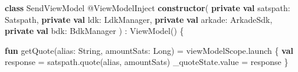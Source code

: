 \documentclass[
]{article}
\newenvironment{Shaded}{}{}
\newcommand{\DataTypeTok}[1]{\textcolor[rgb]{0.56,0.13,0.00}{#1}}
\newcommand{\FunctionTok}[1]{\textcolor[rgb]{0.02,0.16,0.49}{#1}}
\newcommand{\KeywordTok}[1]{\textcolor[rgb]{0.00,0.44,0.13}{\textbf{#1}}}
\newcommand{\NormalTok}[1]{#1}
\newcommand{\OperatorTok}[1]{\textcolor[rgb]{0.40,0.40,0.40}{#1}}
\newcommand{\VariableTok}[1]{\textcolor[rgb]{0.10,0.09,0.49}{#1}}
\begin{document}
\begin{Shaded}
\begin{Highlighting}[]
\KeywordTok{class}\NormalTok{ SendViewModel @ViewModelInject }\KeywordTok{constructor}\OperatorTok{(}
    \KeywordTok{private} \KeywordTok{val} \VariableTok{satspath}\OperatorTok{:} \DataTypeTok{Satspath}\OperatorTok{,}
    \KeywordTok{private} \KeywordTok{val} \VariableTok{ldk}\OperatorTok{:} \DataTypeTok{LdkManager}\OperatorTok{,}
    \KeywordTok{private} \KeywordTok{val} \VariableTok{arkade}\OperatorTok{:} \DataTypeTok{ArkadeSdk}\OperatorTok{,}
    \KeywordTok{private} \KeywordTok{val} \VariableTok{bdk}\OperatorTok{:} \DataTypeTok{BdkManager}
\OperatorTok{)} \OperatorTok{:} \DataTypeTok{ViewModel}\OperatorTok{()} \OperatorTok{\{}

    \KeywordTok{fun} \FunctionTok{getQuote}\OperatorTok{(}\VariableTok{alias}\OperatorTok{:} \DataTypeTok{String}\OperatorTok{,} \VariableTok{amountSats}\OperatorTok{:} \DataTypeTok{Long}\OperatorTok{)} \OperatorTok{=}\NormalTok{ viewModelScope}\OperatorTok{.}\NormalTok{launch }\OperatorTok{\{}
        \KeywordTok{val} \VariableTok{response} \OperatorTok{=}\NormalTok{ satspath}\OperatorTok{.}\NormalTok{quote}\OperatorTok{(}\NormalTok{alias}\OperatorTok{,}\NormalTok{ amountSats}\OperatorTok{)}
\NormalTok{        \_quoteState}\OperatorTok{.}\NormalTok{value }\OperatorTok{=}\NormalTok{ response}
    \OperatorTok{\}}


\end{Highlighting}
\end{Shaded}
\end{document}
